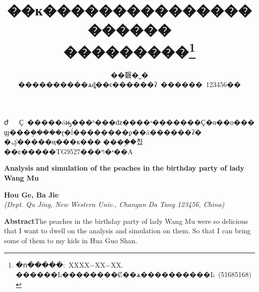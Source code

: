\documentclass[a4paper,11pt,onecolumn,twoside]{article}
\title{\huge{��ĸ���������������������\\
���������}\thanks{�ո�����:~XXXX$-$XX$-$XX. ������Ŀ��������Ȼ��ѧ����������Ŀ~(51685168)}}
\author{��磬�˽�\\[2pt]
\normalsize
����������ѧȡ��ϵ������ʡ~������~123456�� \\[2pt]}
\date{}  %
\begin{document}
\begin{CJK*}{GBK}{song}
\newcommand{\supercite}[1]{\textsuperscript{\cite{#1}}}
\maketitle

\setlength{\oddsidemargin}{ 1cm}  %
\setlength{\evensidemargin}{\oddsidemargin}
\setlength{\textwidth}{13.50cm}
\vspace{-.8cm}
\begin{center}
\parbox{\textwidth}{
ժ~~~Ҫ\quad {}~�����óԣ���ʱ���ǳ����ˣ�������Ҫ�о��о���ϣ���ܸ�����ɽ�ĺ��������ϼ��ã������ʡ�\\
�ؼ���\quad{}��ң���ĸ������ۣ��칬\\
��ͼ�����\quad TG9527\qquad  {}���ױ�ʶ��\quad A}
\end{center}
\vspace{.1cm}
\begin{center}
\parbox{\textwidth}{
{\large{\textbf{Analysis and simulation of the peaches in the birthday party of lady Wang Mu}}}\\
\vspace{-0.5cm}
\begin{center}
\textbf{Hou Ge, Ba Jie}\\[2pt]
\small{\textit{(Dept. Qu Jing, New Western Univ., Changan Da Tang 123456, China)}}\\[2pt]
\end{center}
{\small{\textbf{Abstract}\quad The peaches in the birthday party of lady Wang Mu were so delicious that I want to dwell on the analysis and simulation on them. So that I can bring some of them to my kids in Hua Guo Shan.\\
}}}
\end{center}
\end{CJK*}
\end{document}
